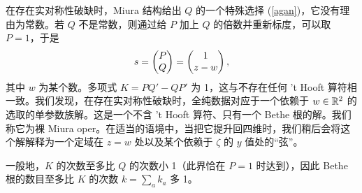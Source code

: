 在存在实对称性破缺时，Miura 结构给出 $Q$ 的一个特殊选择 (\ref{agan})，它没有理由为常数。若 $Q$ 不是常数，则通过给 $P$ 加上 $Q$ 的倍数并重新标度，可以取 $P=1$，于是
\begin{equation}\label{onl} s=\begin{pmatrix}P \cr Q \end{pmatrix}=\begin{pmatrix}1 \cr z-w
\end{pmatrix},\end{equation}
其中 $w$ 为某个数。多项式 $K=PQ'-QP'$ 为 1，这与不存在任何 't Hooft 算符相一致。我们发现，在存在实对称性破缺时，全纯数据对应于一个依赖于 $w\in {\mathbb R}^2$ 的选取的单参数族解。这是一个不含 't Hooft 算符、只有一个 Bethe 根的解。我们称它为裸 Miura oper。在适当的语境中，当把它提升回四维时，我们稍后会将这个解解释为一个定域在 $z=w$ 处以及某个依赖于 $\zeta$ 的 $y$ 值处的“弦”。

一般地，$K$ 的次数至多比 $Q$ 的次数小 1（此界恰在 $P=1$ 时达到），因此 Bethe 根的数目至多比 $K$ 的次数 $k=\sum_ak_a$ 多 1。

